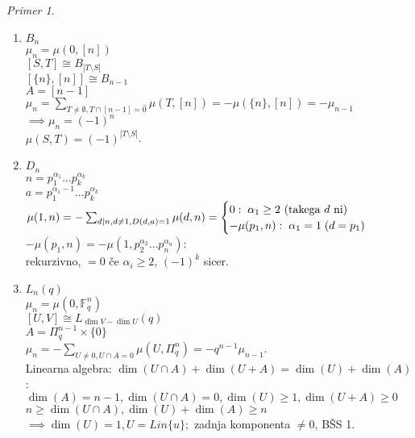 \documentclass[a4paper, 12pt]{book}
\theoremstyle{definition}
\theoremstyle{remark}
\newtheorem*{ex}{Primer}
\newcommand{\F}{\mathbb{F}}
\begin{document}
\begin{ex} \text{} \\
  \begin{enumerate}[label=(\alph*)]
    \item $B_n$ \\
      $\mu_n = \mu(0, [n])$ \\
      $[S, T] \cong B_{|T \setminus S|}$ \\
      $\left[\{n\}, [n]\right] \cong B_{n-1}$ \\
      $A = [n-1]$ \\
      $\mu_n = \sum_{T \neq \emptyset, T \cap [n-1] = \hat{0}} \mu(T, [n])
      = -\mu(\{n\}, [n]) = -\mu_{n-1}$ \\
      $\implies \mu_n = (-1)^n$ \\
      $\mu(S, T) = (-1)^{|T \setminus S|}$.
    \item $D_n$ \\
      $n = p_1^{\alpha_1} \dots p_k^{\alpha_k}$ \\
      $a = p_1^{\alpha_1 - 1} \dots p_k^{\alpha_k}$ \\
      $\mu(1, n) = -\sum_{d | n, d \neq 1, D(d,a) = 1} \mu(d, n) \\
      = \begin{cases}
        0: \; \alpha_1 \geq 2 \text{ (takega $d$ ni)} \\
        -\mu(p_1, n): \; \alpha_1 = 1 \; (d = p_1)
      \end{cases}$ \\
      $-\mu(p_1, n) = -\mu(1, p_2^{\alpha_2} \dots p_n^{\alpha_n})$: \\
      rekurzivno, $=0$ če $\alpha_i \geq 2$, $(-1)^k$ sicer.
    \item $L_n(q)$ \\
      $\mu_n = \mu(0, \F_q^n)$ \\
      $[U, V] \cong L_{\dim V - \dim U}(q)$ \\
      $A = \Pi_q^{n-1} \times \{0\}$ \\
      $\mu_n = -\sum_{U \neq 0, U \cap A = 0} \mu(U, \Pi_q^n) = - q^{n-1} \mu_{n-1}$. \\
      Linearna algebra: $\dim (U \cap A) + \dim (U + A) = \dim (U) + \dim(A)$: \\
      $\dim(A) = n-1, \dim(U \cap A) = 0, \dim(U) \geq 1, \dim(U + A) \geq 0$ \\
      $n \geq \dim(U \cap A), \dim(U) + \dim(A) \geq n$ \\
      $\implies \dim(U) = 1, U = Lin \{u\};$ zadnja komponenta $\neq 0$, BŠS 1. \\

\end{enumerate}
\end{ex}
\end{document}
